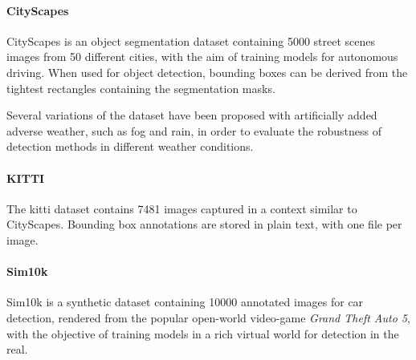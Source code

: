 \documentclass[%
    corpo=12pt,
    twoside,
    stile=classica,   
    tipotesi=magistrale,
    evenboxes,
    english,
	numerazioneromana,
]{toptesi}
\begin{document}
\paragraph{CityScapes}
CityScapes is an object segmentation dataset containing 5000 street scenes images from 50 different cities, with the aim of training models for autonomous driving\cite{cordts2016cityscapes}. When used for object detection, bounding boxes can be derived from the tightest rectangles containing the segmentation masks.

Several variations of the dataset have been proposed with artificially added adverse weather, such as fog\cite{sakaridis2018semantic} and rain\cite{halder2019physicsbased}, in order to evaluate the robustness of detection methods in different weather conditions.

\paragraph{KITTI}
The \gls{kitti} dataset\cite{Geiger2013IJRR} contains 7481 images captured in a context similar to CityScapes. Bounding box annotations are stored in plain text, with one file per image.

\paragraph{Sim10k}
Sim10k is a synthetic dataset containing 10000 annotated images for car detection, rendered from the popular open-world video-game \textit{Grand Theft Auto 5}, with the objective of training models in a rich virtual world for detection in the real\cite{johnsonroberson2017driving}.
\end{document}

